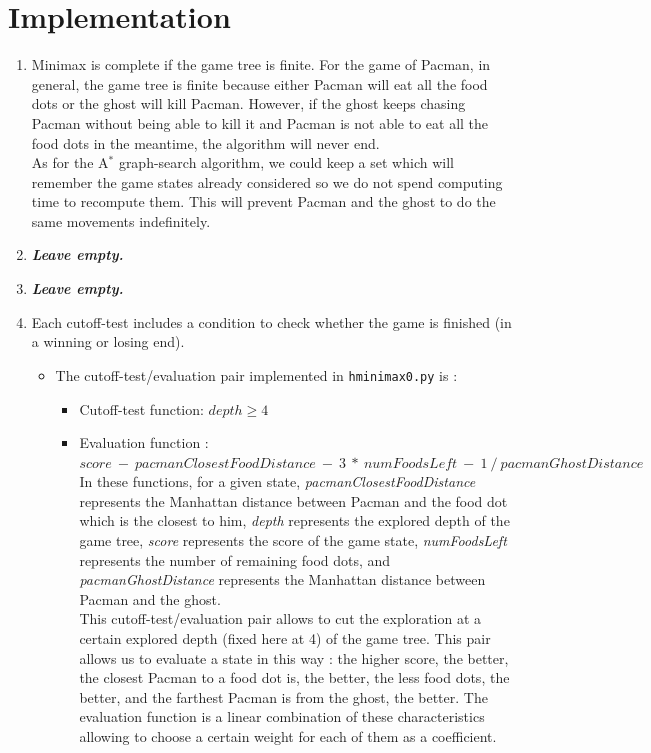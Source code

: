 \documentclass{article}
\begin{document}
\section{Implementation}

\begin{enumerate}[label=\alph*.,leftmargin=*]
    \item Minimax is complete if the game tree is finite. For the game of Pacman, in general, the game tree is finite because either Pacman will eat all the food dots or the ghost will kill Pacman. However, if the ghost keeps chasing Pacman without being able to kill it and Pacman is not able to eat all the food dots in the meantime, the algorithm will never end.\\
    As for the A$^*$ graph-search algorithm, we could keep a set which will remember the game states already considered so we do not spend computing time to recompute them. This will prevent Pacman and the ghost to do the same movements indefinitely.
    \item \textbf{\textit{Leave empty.}}
    \item \textbf{\textit{Leave empty.}}
	\item Each cutoff-test includes a condition to check whether the game is finished (in a winning or losing end).
		\begin{itemize}
			\item The cutoff-test/evaluation pair implemented in \texttt{hminimax0.py} is :
				\begin{itemize}
					\item Cutoff-test function: $depth \geq 4$
					\item Evaluation function : $score \ - \ pacmanClosestFoodDistance \ - \ 3 \ * \ numFoodsLeft \ - \ 1 \ / \ pacmanGhostDistance$\\
					
					In these functions, for a given state, \textit{pacmanClosestFoodDistance} represents the Manhattan distance between Pacman and the food dot which is the closest to him, \textit{depth} represents the explored depth of the game tree, \textit{score} represents the score of the game state, \textit{numFoodsLeft} represents the number of remaining food dots, and \textit{pacmanGhostDistance} represents the Manhattan distance between Pacman and the ghost.\\
					
					This cutoff-test/evaluation pair allows to cut the exploration at a certain explored depth (fixed here at 4) of the game tree. This pair allows us to evaluate a state in this way : the higher score, the better, the closest Pacman to a food dot is, the better, the less food dots, the better, and the farthest Pacman is from the ghost, the better. The evaluation function is a linear combination of these characteristics allowing to choose a certain weight for each of them as a coefficient.\\
				\end{itemize}


\end{itemize}
\end{enumerate}
\end{document}

